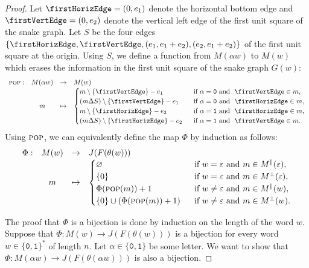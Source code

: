 \documentclass[a4paper,12pt]{amsart}
\newcommand{\0}{\mathtt{0}}
\newcommand{\1}{\mathtt{1}}
\newcommand{\2}{\mathtt{2}}
\newcommand{\3}{\mathtt{3}}
\newcommand{\carreplein}{{\perp}}
\newcommand{\carrevide}{{\parallel}}
\DeclareMathOperator{\pop}{\textsc{pop}}
\begin{document}
\begin{proof}
    Let $\firstHorizEdge=(0,e_1)$ denote the horizontal bottom edge and
    $\firstVertEdge=(0,e_2)$ denote the vertical left edge of the first unit square
    of the snake graph.
    Let $S$ be the four edges $\{\firstHorizEdge, \firstVertEdge, (e_1,e_1+e_2), (e_2,e_1+e_2)\}$
    of the first unit square at the origin.
    Using $S$, we define a function from $M(\alpha w)$ to $M(w)$
    which erases the information in the first unit square of the snake graph $G(w)$:
    \[
    \begin{array}{rccl}
        \pop:& M(\alpha w)&\to& M(w)\\
        &m&\mapsto &
        \begin{cases}
            m\setminus\{\firstVertEdge\} - e_1
            & \text{ if } \alpha = \0 \text{ and } \firstVertEdge\in m,\\
            (m\Delta S)\setminus\{\firstVertEdge\} - e_1
            & \text{ if } \alpha = \0 \text{ and } \firstHorizEdge\in m,\\
            m\setminus\{\firstHorizEdge\} - e_2
            & \text{ if } \alpha = \1 \text{ and } \firstHorizEdge\in m,\\
            (m\Delta S)\setminus\{\firstHorizEdge\} - e_2
            & \text{ if } \alpha = \1 \text{ and } \firstVertEdge\in m.
        \end{cases}
    \end{array}
    \]
    Using $\pop$, we can equivalently define the map $\Phi$ by induction
    as follows:
    \[
    \begin{array}{rccl}
        \Phi:&M(w) & \to & J(F(\theta(w)))\\
        &m & \mapsto &
        \begin{cases}
            \varnothing
            & \text{ if } w=\varepsilon \text{ and } m \in M^\carrevide(\varepsilon),\\
            \{0\}
            & \text{ if } w=\varepsilon \text{ and } m \in M^\carreplein(\varepsilon),\\
            \Phi(\pop(m))+1
            & \text{ if } w\neq\varepsilon \text{ and } m \in M^\carrevide(w),\\
            \{0\} \cup (\Phi(\pop(m))+1)
            & \text{ if } w\neq\varepsilon \text{ and } m \in M^\carreplein(w).
        \end{cases}
    \end{array}
    \]

    The proof that $\Phi$ is a bijection is done by induction on the length of the word $w$.
    Suppose that $\Phi:M(w)\to J(F(\theta(w)))$
    is a bijection for every word $w\in\{\0,\1\}^*$ of length $n$.
    Let $\alpha\in\{\0,\1\}$ be some letter.
    We want to show that $\Phi:M(\alpha w)\to J(F(\theta(\alpha w)))$
    is also a bijection.


\end{proof}
\end{document}
